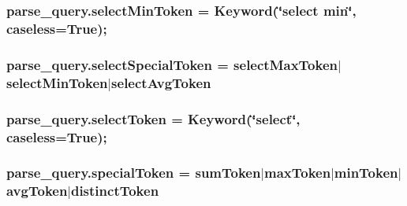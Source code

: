 \subsubsection[{\texorpdfstring{select\+Min\+Token}{selectMinToken}}]{\setlength{\rightskip}{0pt plus 5cm}parse\+\_\+query.\+select\+Min\+Token = Keyword(\char`\"{}select min\char`\"{}, caseless=True);}\hypertarget{namespaceparse__query_a441827d35b414007260820129ba7a0cb}{}\label{namespaceparse__query_a441827d35b414007260820129ba7a0cb}
\subsubsection[{\texorpdfstring{select\+Special\+Token}{selectSpecialToken}}]{\setlength{\rightskip}{0pt plus 5cm}parse\+\_\+query.\+select\+Special\+Token = {\bf select\+Max\+Token}$\vert${\bf select\+Min\+Token}$\vert${\bf select\+Avg\+Token}}\hypertarget{namespaceparse__query_aa03154051f4fe9a18a73ebcd36624d11}{}\label{namespaceparse__query_aa03154051f4fe9a18a73ebcd36624d11}
\subsubsection[{\texorpdfstring{select\+Token}{selectToken}}]{\setlength{\rightskip}{0pt plus 5cm}parse\+\_\+query.\+select\+Token = Keyword(\char`\"{}select\char`\"{}, caseless=True);}\hypertarget{namespaceparse__query_aa9979d0331f3924dcf931d9d1f1aebea}{}\label{namespaceparse__query_aa9979d0331f3924dcf931d9d1f1aebea}
\subsubsection[{\texorpdfstring{special\+Token}{specialToken}}]{\setlength{\rightskip}{0pt plus 5cm}parse\+\_\+query.\+special\+Token = {\bf sum\+Token}$\vert${\bf max\+Token}$\vert${\bf min\+Token}$\vert${\bf avg\+Token}$\vert${\bf distinct\+Token}}\hypertarget{namespaceparse__query_aee714d7bc945420e350fd4037ac31476}{}\label{namespaceparse__query_aee714d7bc945420e350fd4037ac31476}
